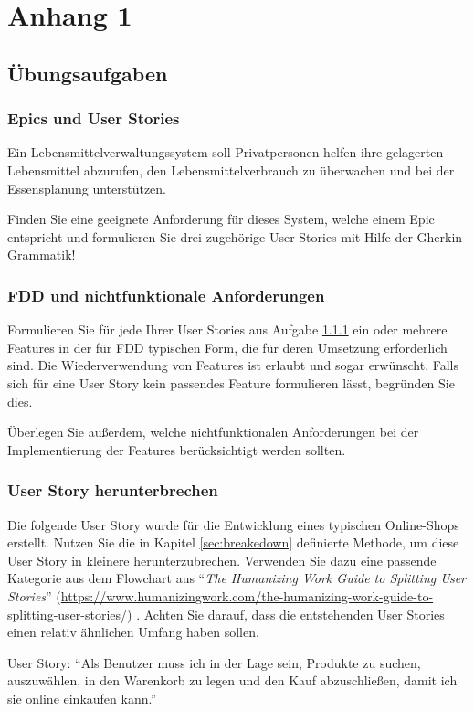 \documentclass[acmtog]{acmart}
\begin{document}



\appendix

\section{Anhang 1}

\subsection{Übungsaufgaben}
\subsubsection{Epics und User Stories}\label{aufg:epics-und-user-stories}
Ein Lebensmittelverwaltungssystem soll Privatpersonen helfen ihre gelagerten Lebensmittel abzurufen,
den Lebensmittelverbrauch zu überwachen und bei der Essensplanung unterstützen.

Finden Sie eine geeignete Anforderung für dieses System, welche einem Epic entspricht und formulieren Sie drei zugehörige
User Stories mit Hilfe der Gherkin-Grammatik!

\subsubsection{FDD und nichtfunktionale Anforderungen}
Formulieren Sie für jede Ihrer User Stories aus Aufgabe \ref{aufg:epics-und-user-stories} ein oder mehrere Features in der für FDD typischen Form, die für deren Umsetzung erforderlich sind. Die Wiederverwendung von Features ist erlaubt und sogar erwünscht. Falls sich für eine User Story kein passendes Feature formulieren lässt, begründen Sie dies.

Überlegen Sie außerdem, welche nichtfunktionalen Anforderungen bei der Implementierung der Features berücksichtigt werden sollten.

\subsubsection{User Story herunterbrechen}
Die folgende User Story wurde für die Entwicklung eines typischen Online-Shops erstellt. Nutzen Sie die in Kapitel \ref{sec:breakedown} definierte Methode, 
um diese User Story in kleinere herunterzubrechen. Verwenden Sie dazu eine passende Kategorie aus dem Flowchart aus ``\emph{The Humanizing Work Guide to Splitting User Stories}'' (\url{https://www.humanizingwork.com/the-humanizing-work-guide-to-splitting-user-stories/}) \cite{humanizingwork}.
Achten Sie darauf, dass die entstehenden User Stories einen relativ ähnlichen Umfang haben sollen.

User Story:
``Als Benutzer muss ich in der Lage sein, Produkte zu suchen, auszuwählen, in den Warenkorb zu legen und den Kauf abzuschließen, damit ich sie online einkaufen kann.''
\end{document}
